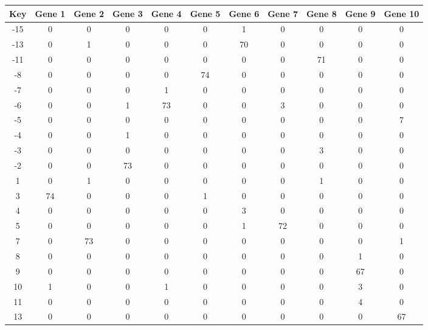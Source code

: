 \begin{tabular}{|c|c|c|c|c|c|c|c|c|c|c|}
\hline
Key & Gene 1 & Gene 2 & Gene 3 & Gene 4 & Gene 5 & Gene 6 & Gene 7 & Gene 8 & Gene 9 & Gene 10 \\
\hline
-15 & 0 & 0 & 0 & 0 & 0 & 1 & 0 & 0 & 0 & 0 \\
-13 & 0 & 1 & 0 & 0 & 0 & 70 & 0 & 0 & 0 & 0 \\
-11 & 0 & 0 & 0 & 0 & 0 & 0 & 0 & 71 & 0 & 0 \\
-8 & 0 & 0 & 0 & 0 & 74 & 0 & 0 & 0 & 0 & 0 \\
-7 & 0 & 0 & 0 & 1 & 0 & 0 & 0 & 0 & 0 & 0 \\
-6 & 0 & 0 & 1 & 73 & 0 & 0 & 3 & 0 & 0 & 0 \\
-5 & 0 & 0 & 0 & 0 & 0 & 0 & 0 & 0 & 0 & 7 \\
-4 & 0 & 0 & 1 & 0 & 0 & 0 & 0 & 0 & 0 & 0 \\
-3 & 0 & 0 & 0 & 0 & 0 & 0 & 0 & 3 & 0 & 0 \\
-2 & 0 & 0 & 73 & 0 & 0 & 0 & 0 & 0 & 0 & 0 \\
1 & 0 & 1 & 0 & 0 & 0 & 0 & 0 & 1 & 0 & 0 \\
3 & 74 & 0 & 0 & 0 & 1 & 0 & 0 & 0 & 0 & 0 \\
4 & 0 & 0 & 0 & 0 & 0 & 3 & 0 & 0 & 0 & 0 \\
5 & 0 & 0 & 0 & 0 & 0 & 1 & 72 & 0 & 0 & 0 \\
7 & 0 & 73 & 0 & 0 & 0 & 0 & 0 & 0 & 0 & 1 \\
8 & 0 & 0 & 0 & 0 & 0 & 0 & 0 & 0 & 1 & 0 \\
9 & 0 & 0 & 0 & 0 & 0 & 0 & 0 & 0 & 67 & 0 \\
10 & 1 & 0 & 0 & 1 & 0 & 0 & 0 & 0 & 3 & 0 \\
11 & 0 & 0 & 0 & 0 & 0 & 0 & 0 & 0 & 4 & 0 \\
13 & 0 & 0 & 0 & 0 & 0 & 0 & 0 & 0 & 0 & 67 \\
\hline
\end{tabular}